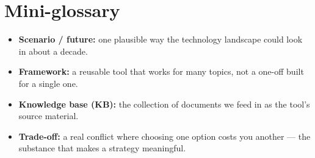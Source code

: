 \documentclass[11pt,a4paper]{article}
\begin{document}
\section{Mini-glossary}
\begin{itemize}
  \item \textbf{Scenario / future:} one plausible way the technology landscape could look in about a decade.
  \item \textbf{Framework:} a reusable tool that works for many topics, not a one-off built for a single one.
  \item \textbf{Knowledge base (KB):} the collection of documents we feed in as the tool's source material.
  \item \textbf{Trade-off:} a real conflict where choosing one option costs you another --- the
        substance that makes a strategy meaningful.
\end{itemize}
\end{document}
